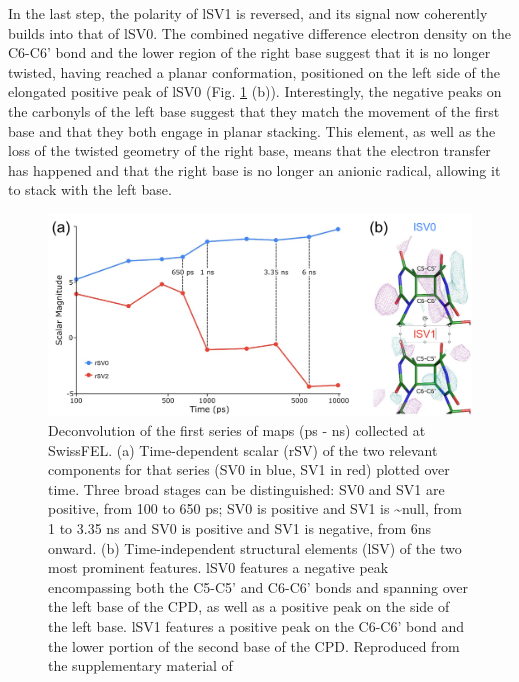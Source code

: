 In the last step, the polarity of lSV1 is reversed, and its signal now coherently builds into that of lSV0. The combined negative difference electron density on the C6-C6' bond and the lower region of the right base suggest that it is no longer twisted, having reached a planar conformation, positioned on the left side of the elongated positive peak of lSV0 (Fig. \ref{fig:SwissFEL_SVD_MmCPDII} (b)). Interestingly, the negative peaks on the carbonyls of the left base suggest that they match the movement of the first base and that they both engage in planar stacking. This element, as well as the loss of the twisted geometry of the right base, means that the electron transfer has happened and that the right base is no longer an anionic radical, allowing it to stack with the left base. 

\begin{figure}[H]
  \centering
  \includegraphics[width=\textwidth]{images/cracry/SwissFEL_SVD.pdf}
  \hfill
  \caption{Deconvolution of the first series of maps (ps - ns) collected at SwissFEL. (a) Time-dependent scalar (rSV) of the two relevant components for that series (SV0 in blue, SV1 in red) plotted over time. Three broad stages can be distinguished: SV0 and SV1 are positive, from 100 to 650 ps; SV0 is positive and SV1 is \textasciitilde null, from 1 to 3.35 ns and SV0 is positive and SV1 is negative, from 6ns onward. (b) Time-independent structural elements (lSV) of the two most prominent features. lSV0 features a negative peak encompassing both the C5-C5' and C6-C6' bonds and spanning over the left base of the CPD, as well as a positive peak on the side of the left base. lSV1 features a positive peak on the C6-C6' bond and the lower portion of the second base of the CPD. Reproduced from the supplementary material of \cite{maestre-reynaVisualizingDNARepair2023a}}\label{fig:SwissFEL_SVD_MmCPDII}
\end{figure}

